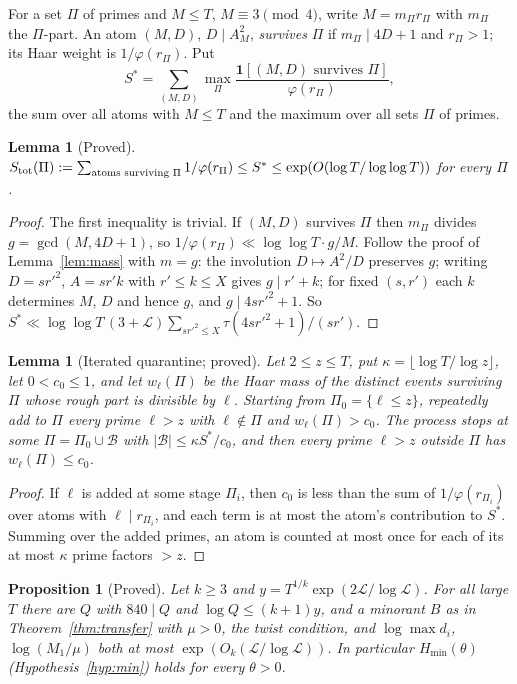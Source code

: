 \documentclass[11pt,reqno]{amsart}
\newtheorem{lemma}[theorem]{Lemma}
\newtheorem{proposition}[theorem]{Proposition}
\theoremstyle{definition}
\newcommand{\Lc}{\mathcal L}
\begin{document}
For a set $\Pi$ of primes and $M\le T$, $M\equiv3\pmod4$, write $M=m_\Pi r_\Pi$ with
$m_\Pi$ the $\Pi$-part.  An atom $(M,D)$, $D\mid A_M^2$, \emph{survives} $\Pi$ if
$m_\Pi\mid4D+1$ and $r_\Pi>1$; its Haar weight is $1/\varphi(r_\Pi)$.  Put
\[
 S^*=\sum_{(M,D)}\max_\Pi\frac{\mathbf 1[(M,D)\text{ survives }\Pi]}{\varphi(r_\Pi)},
\]
the sum over all atoms with $M\le T$ and the maximum over all sets $\Pi$ of primes.

\begin{lemma}[Proved]\label{lem:qmass}
$S_{\rm tot}(\Pi):=\sum_{\text{atoms surviving }\Pi}1/\varphi(r_\Pi)\le S^*\le\exp(O(\log T/\log\log T))$
for every $\Pi$.
\end{lemma}

\begin{proof}
The first inequality is trivial.  If $(M,D)$ survives $\Pi$ then $m_\Pi$
divides $g=\gcd(M,4D+1)$, so $1/\varphi(r_\Pi)\ll\log\log T\cdot g/M$.  Follow
the proof of Lemma~\ref{lem:mass} with $m=g$: the involution $D\mapsto A^2/D$
preserves $g$; writing $D=sr'^2$, $A=sr'k$ with $r'\le k\le X$ gives
$g\mid r'+k$; for fixed $(s,r')$ each $k$ determines $M$, $D$ and hence $g$, and
$g\mid4sr'^2+1$.  So $S^*\ll\log\log T\,(3+\Lc)\sum_{sr'^2\le X}\tau(4sr'^2+1)/(sr')$.
\end{proof}

\begin{lemma}[Iterated quarantine; proved]\label{lem:iterq}
Let $2\le z\le T$, put $\kappa=\lfloor\log T/\log z\rfloor$, let $0<c_0\le1$, and let
$w_\ell(\Pi)$ be the Haar mass of the distinct events surviving $\Pi$ whose
rough part is divisible by $\ell$.  Starting from $\Pi_0=\{\ell\le z\}$,
repeatedly add to $\Pi$ every prime $\ell>z$ with $\ell\notin\Pi$ and
$w_\ell(\Pi)>c_0$.  The process stops at some $\Pi=\Pi_0\cup\mathcal B$ with $|\mathcal B|\le\kappa S^*/c_0$, and
then every prime $\ell>z$ outside $\Pi$ has $w_\ell(\Pi)\le c_0$.
\end{lemma}

\begin{proof}
If $\ell$ is added at some stage $\Pi_i$, then $c_0$ is less than the sum of
$1/\varphi(r_{\Pi_i})$ over atoms with $\ell\mid r_{\Pi_i}$, and each term is at most
the atom's contribution to $S^*$.  Summing over the added primes, an atom is
counted at most once for each of its at most $\kappa$ prime factors $>z$.
\end{proof}

\begin{proposition}[Proved]\label{prop:hmin}
Let $k\ge3$ and $y=T^{1/k}\exp(2\Lc/\log\Lc)$.  For all large $T$ there are
$Q$ with $840\mid Q$ and $\log Q\le(k+1)y$, and a minorant $B$ as in
Theorem~\ref{thm:transfer} with $\mu>0$, the twist condition, and
$\log\max d_i$, $\log(M_1/\mu)$ both at most $\exp(O_k(\Lc/\log\Lc))$.  In
particular $H_{\min}(\theta)$ \textup{(}Hypothesis~\ref{hyp:min}\textup{)} holds
for every $\theta>0$.
\end{proposition}
\end{document}
